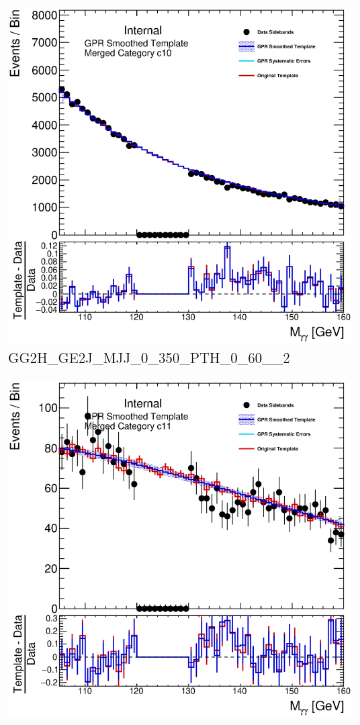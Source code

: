 \begin{figure} 
\begin{center}
\begin{subfigure}[T]{0.49\linewidth}
	\centering
	\includegraphics[width=\linewidth]{figures/background/gpr/coupCatTemplates/GPR_Smoothed_Plot_hmgg_c10.eps}
	\caption{GG2H\_GE2J\_MJJ\_0\_350\_PTH\_0\_60\_\_2}
\end{subfigure}
\begin{subfigure}[T]{0.49\linewidth}
	\centering
	\includegraphics[width=\linewidth]{figures/background/gpr/coupCatTemplates/GPR_Smoothed_Plot_hmgg_c11.eps}

\end{subfigure}
\end{center}
\end{figure}
